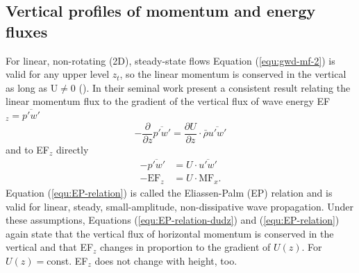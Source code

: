\subsection*{Vertical profiles of momentum and energy fluxes}
For linear, non-rotating (2D), steady-state flows Equation (\ref{equ:gwd-mf-2}) is valid for any upper level $z_t$, so the linear momentum is conserved in the vertical as long as U$\neq 0$ (\cite[]{durran_lee_2003}). In their seminal work \textcite[]{eliassen_transfer_1960} present a consistent result relating the linear momentum flux to the gradient of the vertical flux of wave energy EF$_z = \overbar{p'w'}$
\begin{equation}
    -\frac{\partial}{\partial z}\overbar{p'w'} = \frac{\partial U}{\partial z} \cdot \bar{\rho} \overbar{u'w'}
    \label{equ:EP-relation-dudz}
\end{equation}
and to EF$_z$ directly
\begin{equation}
    \begin{aligned}
    -\overbar{p'w'}& = U \cdot \overbar{u'w'} \\
    -\mathrm{EF}_z& = U \cdot \mathrm{MF}_x.
    \end{aligned}
    \label{equ:EP-relation}
\end{equation}
Equation (\ref{equ:EP-relation}) is called the Eliassen-Palm (EP) relation and is valid for linear, steady, small-amplitude, non-dissipative wave propagation. Under these assumptions, Equations (\ref{equ:EP-relation-dudz}) and (\ref{equ:EP-relation}) again state that the vertical flux of horizontal momentum is conserved in the vertical and that EF$_z$ changes in proportion to the gradient of $U(z)$. For $U(z)=$const. EF$_z$ does not change with height, too.

